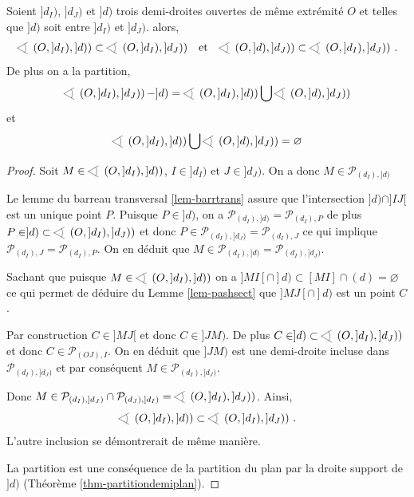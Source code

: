 \begin{thm}\label{thm-incluspart}
    Soient $]d_I)$, $]d_J)$ et $]d)$ trois demi-droites ouvertes de même extrémité $O$ et telles que $]d)$ soit entre $]d_I)$ et $]d_J)$. alors,
    \begin{equation*}
    \begin{array}{ccc}
         \anglesaillant\left({O},{]d_I)},{]d)}\right)\subset \anglesaillant\left({O},{]d_I)},{]d_J)}\right) & \text{et} & \anglesaillant\left({O},{]d)},{]d_J)}\right)\subset\anglesaillant\left({O},{]d_I)},{]d_J)}\right)\,.
    \end{array}
    \end{equation*}
    De plus on a la partition,
    \begin{equation*}
        \anglesaillant\left({O},{]d_I)},{]d_J)}\right) - ]d) = \anglesaillant\left({O},{]d_I)},{]d)}\right) \bigcup \anglesaillant\left({O},{]d)},{]d_J)}\right) 
    \end{equation*}
    et
    \begin{equation*}
        \anglesaillant\left({O},{]d_I)},{]d)}\right) \bigcup \anglesaillant\left({O},{]d)},{]d_J)}\right) = \varnothing
    \end{equation*}
\begin{proof}
    Soit $M\in \anglesaillant\left({O},{]d_I)},{]d)}\right)$, $I\in]d_I)$ et $J\in]d_J)$. On a donc $M\in\mathcal{P}_{(d_I),]d)}$
    
    Le lemme du barreau transversal \ref{lem-barrtrans} assure que l'intersection $]d)\cap ]IJ[$ est un unique point $P$. Puisque $P\in]d)$, on a $\mathcal{P}_{(d_I),]d)}=\mathcal{P}_{(d_I),P}$ de plus $P\in ]d)\subset \anglesaillant\left({O},{]d_I)},{]d_J)}\right)$ et donc $P\in \mathcal{P}_{(d_I),]d_J)}=\mathcal{P}_{(d_I),J}$ ce qui implique $\mathcal{P}_{(d_I),J}=\mathcal{P}_{(d_I),P}$. On en déduit que $M\in \mathcal{P}_{(d_I),]d)} = \mathcal{P}_{(d_I),]d_J)}$.

    Sachant que puisque $M\in \anglesaillant\left({O},{]d_I)},{]d)}\right)$ on a $]MI[\cap ]d)\subset [MI]\cap (d)=\varnothing$ ce qui permet de déduire du Lemme \ref{lem-pashsect} que $]MJ[\cap ]d)$ est un point $C$ . 

    Par construction $C\in]MJ[$ et donc $C\in]JM)$. De plus $C\in ]d)\subset \anglesaillant\left({O},{]d_I)},{]d_J)}\right)$ et donc $C\in \mathcal{P}_{(OJ),I}$. On en déduit que $]JM)$ est une demi-droite incluse dans $\mathcal{P}_{(d_I),]d_J)}$ et par conséquent $M\in\mathcal{P}_{(d_I),]d_J)}$.

    Donc $M\in \mathcal{P}_{(d_I),]d_J)}\cap \mathcal{P}_{(d_J),]d_I)}= \anglesaillant\left({O},{]d_I)},{]d_J)}\right)$. Ainsi,
    \begin{equation*}
        \anglesaillant\left({O},{]d_I)},{]d)}\right)\subset \anglesaillant\left({O},{]d_I)},{]d_J)}\right) \,.
    \end{equation*}
    L'autre inclusion se démontrerait de même manière.

    La partition est une conséquence de la partition du plan par la droite support de $]d)$ (Théorème \ref{thm-partitiondemiplan}). 
\end{proof}
\end{thm}

